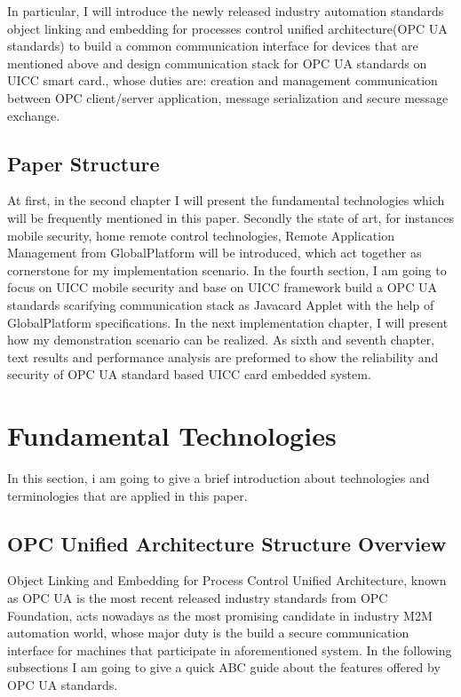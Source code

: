\documentclass[]{llncs}
\begin{document}
In particular, I will introduce the newly released industry automation standards object linking and embedding for processes control unified architecture(OPC UA standards) to build a common communication interface for devices that are mentioned above and design communication stack for OPC UA standards on UICC smart card., whose  duties are: creation and management communication between OPC client/server application, message serialization and secure message exchange.

\subsection{Paper Structure}
At first, in the second chapter I will present the fundamental technologies which will be frequently mentioned in this paper. Secondly the state of art, for instances mobile security,  home remote control technologies, Remote Application Management from GlobalPlatform will be introduced, which act together as cornerstone for my implementation scenario. In the fourth section, I am going to focus on  UICC mobile security  and base on UICC framework build a  OPC UA standards scarifying communication stack  as Javacard Applet with the help of GlobalPlatform  specifications. In the next implementation chapter, I will present how my  demonstration scenario can be realized. As sixth and seventh chapter, text results and performance analysis are preformed to show the reliability and security of OPC UA standard based UICC card  embedded  system.
  
\section{Fundamental Technologies}
In this section, i am going to give a brief introduction about technologies and terminologies that are applied in this paper. 

\subsection{OPC Unified Architecture Structure Overview }
Object Linking and Embedding for Process Control Unified Architecture, known as OPC UA is the most recent released industry standards from OPC Foundation, acts nowadays as the most promising candidate in industry M2M automation world, whose major duty is the build a secure communication interface for machines that participate in aforementioned system. In the following subsections I am going to give a quick ABC guide about the features offered by OPC UA standards.
\end{document}
